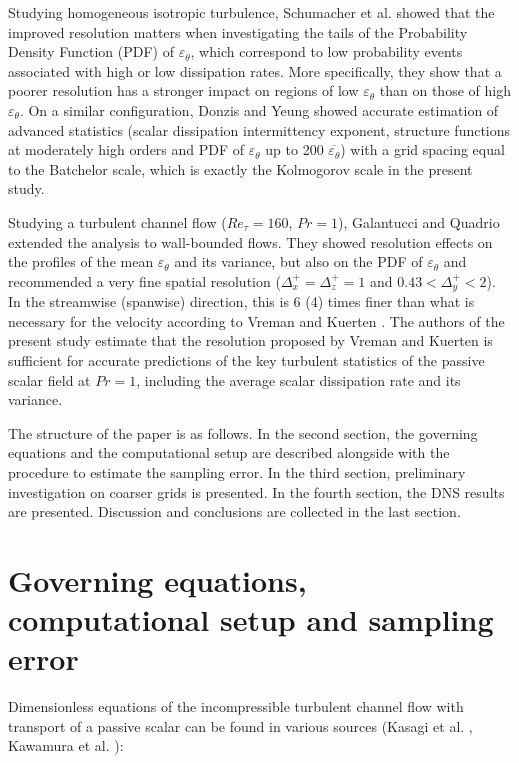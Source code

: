 \documentclass[review]{elsarticle}
\newcommand{\gqcite}{Galantucci and Quadrio \cite{galantucci2010very}}
\newcommand{\epst}{\varepsilon_\theta}
\begin{document}
Studying homogeneous isotropic turbulence, Schumacher et al. \cite{schumacher2005very} showed that the improved resolution matters when investigating the tails of the Probability Density Function (PDF) of $\epst$, which correspond to low probability events associated with high or low dissipation rates. More specifically, they show that a poorer resolution has a stronger impact on regions of low $\epst$ than on those of high $\epst$. On a similar configuration, Donzis and Yeung \cite{donzis2010resolution} showed accurate estimation of advanced statistics (scalar dissipation intermittency exponent, structure functions at moderately high orders and PDF of $\epst$ up to 200 $\overline{\epst}$) with a grid spacing equal to the Batchelor scale, which is exactly the Kolmogorov scale in the present study.

Studying a turbulent channel flow ($Re_\tau=160$, $Pr=1$), \gqcite ~ extended the analysis to wall-bounded flows. They showed resolution effects on the profiles of the mean $\epst$ and its variance, but also on the PDF of $\epst$ and recommended a very fine spatial resolution ($\Delta_x^+=\Delta_z^+=1$ and $0.43<\Delta_y^+<2$). In the streamwise (spanwise) direction, this is 6 (4) times finer than what is necessary for the velocity according to Vreman and Kuerten \cite{vreman2014comparison}. The authors of the present study estimate that the resolution proposed by Vreman and Kuerten is sufficient for accurate predictions of the key turbulent statistics of the passive scalar field at $Pr=1$, including the average scalar dissipation rate and its variance.
 
The structure of the paper is as follows. In the second section, the governing equations and the computational setup are described alongside with the procedure to estimate the sampling error. In the third section, preliminary investigation on coarser grids is presented. In the fourth section, the DNS results are presented. Discussion and conclusions are collected in the last section.

\section{Governing equations, computational setup and sampling error}

Dimensionless equations of the incompressible turbulent channel flow with transport of a passive scalar can be found in various sources (Kasagi et al. \cite{kasagi1991direct}, Kawamura et al. \cite{kawamura1998dns}):
\end{document}

